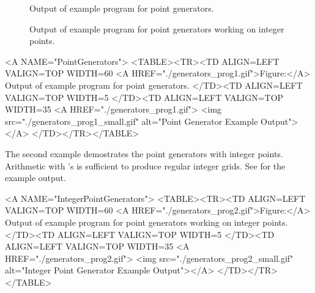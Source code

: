 
\begin{ccTexOnly}
  \begin{figure}
    \noindent
    \hspace*{0.025\textwidth}%
    \begin{minipage}{0.45\textwidth}%
      \caption{Output of example program for point generators.}
      \label{figurePointGenerator}
    \end{minipage}%
    \hspace*{0.05\textwidth}%
    \begin{minipage}{0.45\textwidth}%
      \caption{Output of example program for point generators working
        on integer points.}
      \label{figureIntegerPointGenerator}
    \end{minipage}%
  \end{figure}
\end{ccTexOnly}

\begin{ccHtmlOnly}
  <A NAME="PointGenerators">
  <TABLE><TR><TD ALIGN=LEFT VALIGN=TOP WIDTH=60%
    <A HREF="./generators_prog1.gif">Figure:</A>
    Output of example program for point generators.
  </TD><TD ALIGN=LEFT VALIGN=TOP WIDTH=5%
  </TD><TD ALIGN=LEFT VALIGN=TOP WIDTH=35%
    <A HREF="./generators_prog1.gif">
        <img src="./generators_prog1_small.gif" 
             alt="Point Generator Example Output"></A>
  </TD></TR></TABLE>
\end{ccHtmlOnly}


The second example demostrates the point generators with integer
points. Arithmetic with 's is sufficient to produce
regular integer grids. See 
for the example output.


\begin{ccHtmlOnly}
  <A NAME="IntegerPointGenerators">
  <TABLE><TR><TD ALIGN=LEFT VALIGN=TOP WIDTH=60%
    <A HREF="./generators_prog2.gif">Figure:</A>
        Output of example program for point generators working
        on integer points.
  </TD><TD ALIGN=LEFT VALIGN=TOP WIDTH=5%
  </TD><TD ALIGN=LEFT VALIGN=TOP WIDTH=35%
    <A HREF="./generators_prog2.gif">
        <img src="./generators_prog2_small.gif" 
             alt="Integer Point Generator Example Output"></A>
  </TD></TR></TABLE>
\end{ccHtmlOnly}


